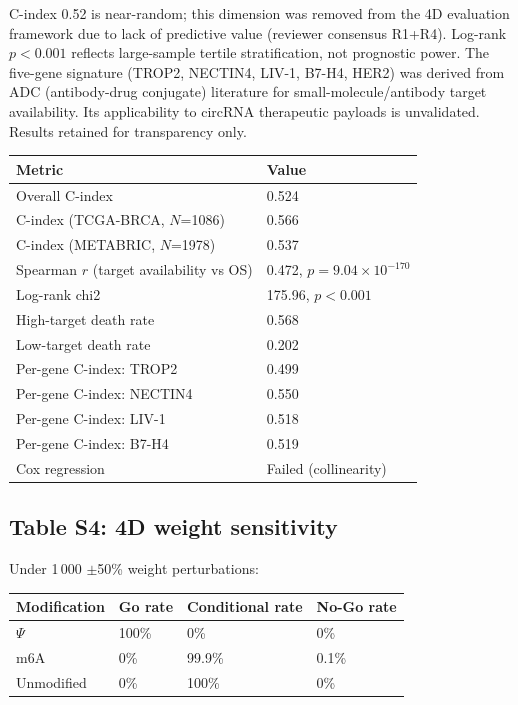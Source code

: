\small C-index 0.52 is near-random; this dimension was removed from the 4D evaluation framework due to lack of predictive value (reviewer consensus R1+R4). Log-rank $p{<}0.001$ reflects large-sample tertile stratification, not prognostic power. The five-gene signature (TROP2, NECTIN4, LIV-1, B7-H4, HER2) was derived from ADC (antibody-drug conjugate) literature for small-molecule/antibody target availability. Its applicability to circRNA therapeutic payloads is unvalidated. Results retained for transparency only.

\begin{tabular}{ll}
\toprule
\textbf{Metric} & \textbf{Value} \\
\midrule
Overall C-index & 0.524 \\
C-index (TCGA-BRCA, $N$=1086) & 0.566 \\
C-index (METABRIC, $N$=1978) & 0.537 \\
Spearman $r$ (target availability vs OS) & 0.472, $p{=}9.04{\times}10^{-170}$ \\
Log-rank chi2 & 175.96, $p{<}0.001$ \\
High-target death rate & 0.568 \\
Low-target death rate & 0.202 \\
Per-gene C-index: TROP2 & 0.499 \\
Per-gene C-index: NECTIN4 & 0.550 \\
Per-gene C-index: LIV-1 & 0.518 \\
Per-gene C-index: B7-H4 & 0.519 \\
Cox regression & Failed (collinearity) \\
\bottomrule
\end{tabular}

\subsection*{Table S4: 4D weight sensitivity}

Under 1\,000 $\pm$50\% weight perturbations:
\begin{tabular}{llll}
\toprule
\textbf{Modification} & \textbf{Go rate} & \textbf{Conditional rate} & \textbf{No-Go rate} \\
\midrule
$\Psi$ & 100\% & 0\% & 0\% \\
m6A & 0\% & 99.9\% & 0.1\% \\
Unmodified & 0\% & 100\% & 0\% \\
\bottomrule
\end{tabular}

